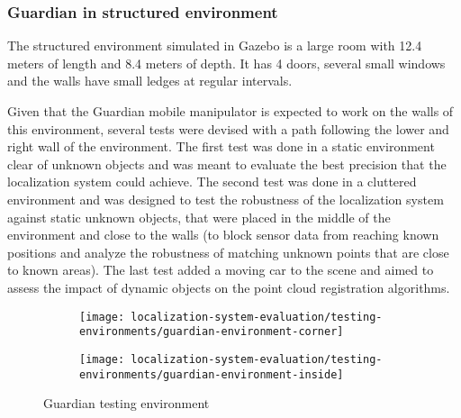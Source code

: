 \subsubsection{Guardian in structured environment}

The structured environment simulated in Gazebo is a large room with 12.4 meters of length and 8.4 meters of depth. It has 4 doors, several small windows and the walls have small ledges at regular intervals.

Given that the Guardian mobile manipulator is expected to work on the walls of this environment, several tests were devised with a path following the lower and right wall of the environment. The first test was done in a static environment clear of unknown objects and was meant to evaluate the best precision that the localization system could achieve. The second test was done in a cluttered environment and was designed to test the robustness of the localization system against static unknown objects, that were placed in the middle of the environment and close to the walls (to block sensor data from reaching known positions and analyze the robustness of matching unknown points that are close to known areas). The last test added a moving car to the scene and aimed to assess the impact of dynamic objects on the point cloud registration algorithms.


\begin{figure}[H]
	\centering
	\begin{subfigure}[ht]{0.43\textwidth}
		\centering
		\texttt{[image: localization-system-evaluation/testing-environments/guardian-environment-corner]}
	\end{subfigure}
	\begin{subfigure}[ht]{0.43\textwidth}
		\centering
		\texttt{[image: localization-system-evaluation/testing-environments/guardian-environment-inside]}
	\end{subfigure}
	\caption{Guardian testing environment}
	\label{fig:localization-system-evaluation_guardian-tests-environment}
\end{figure}

